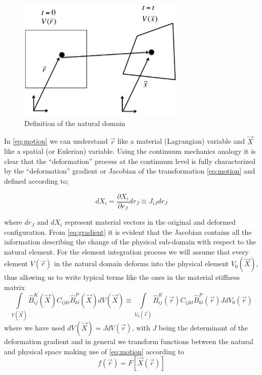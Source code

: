 \begin{figure}[h]
\centering
\includegraphics[width=8cm]{img/figure1.pdf}
\caption{Definition of the natural domain}
\label{fig:natural domain}
\end{figure}

 

In \cref{eq:motion} we can understand $\vec{r}$ like a material (Lagrangian) variable and $\vec{X}$ like a spatial (or Eulerian) variable. Using the continuum mechanics analogy it is clear that the ``deformation'' process at the continuum level is fully characterized by the ``deformation'' gradient or Jacobian of the transformation \cref{eq:motion} and defined according to;

\begin{equation}
dX_i=\dfrac{\partial X_i}{\partial r_J}dr_J\equiv J_{iJ}dr_{J}
\label{eq:gradient}
\end{equation}

where $dr_{J}$ and $dX_i$ represent material vectors in the original and deformed configuration. From \cref{eq:gradient} it is evident that the Jacobian contains all the information describing the change of the physical sub-domain with respect to the natural element. For the element integration process we will assume that every element $V(\vec{r})$ in the natural domain deforms into the physical element $V_0(\vec{X})$, thus allowing us to write typical terms like the ones in the material stiffness matrix
\begin{equation}
\int\limits_{V(\vec{X})} \hat{B}_{ij}^K(\vec{X}) C_{ijkl} \hat{B}_{kl}^P(\vec{X}) dV(\vec{X})\equiv \int\limits_{V_0(\vec{r})} \hat{B}_{ij}^K(\vec{r}) C_{ijkl} \hat{B}_{kl}^P(\vec{r})J dV_0(\vec{r})
\label{eq:matmatrix}
\end{equation}
where we have used $dV(\vec{X})=JdV(\vec{r})$, with $J$ being the determinant of the deformation gradient and in general we transform functions between the natural and physical space making use of \cref{eq:motion} according to
\begin{equation}
f(\vec{r})=F[\vec{X}(\vec{r})]
\label{eq:funtrans}
\end{equation}

